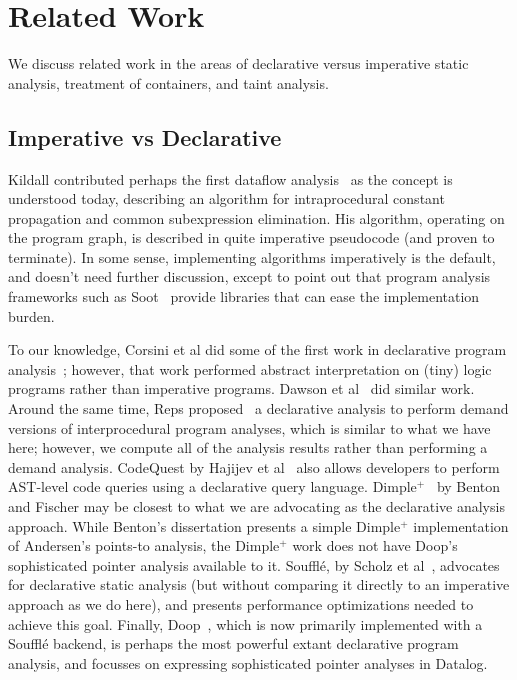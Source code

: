 \chapter{Related Work}
\label{chap:related}

We discuss related work in the areas of declarative versus imperative static analysis, treatment of containers, and taint analysis.

\section{Imperative vs Declarative}

Kildall contributed perhaps the first dataflow analysis~\cite{kildall73:_unified_approac_global_progr_optim} as the concept is understood today, describing an algorithm for intraprocedural constant propagation and common subexpression elimination. His algorithm, operating on the program graph, is described in quite imperative pseudocode (and proven to terminate). In some sense, implementing algorithms imperatively is the default, and doesn't need further discussion, except to point out that program analysis frameworks such as Soot~\cite{Vallee-Rai:1999:SJB:781995.782008} provide libraries that can ease the implementation burden.

To our knowledge, Corsini et al did some of the first work in declarative program analysis~\cite{corsini93:_effic}; however, that work performed abstract interpretation on (tiny) logic programs rather than imperative programs. Dawson et al~\cite{dawson96:_pract_progr_analy_using_gener} did similar work. Around the same time, Reps proposed~\cite{Reps1995} a declarative analysis to perform demand versions of interprocedural program analyses, which is similar to what we have here; however, we compute all of the analysis results rather than performing a demand analysis. CodeQuest by Hajijev et al~\cite{hajiyev06} also allows developers to perform AST-level code queries using a declarative query language. {\sc Dimple$^+$}~\cite{benton07:_inter_scalab_declar_progr_analy}\cite[Chapter 3]{benton08:_fast_effec_progr_analy_objec_level_paral} by Benton and Fischer may be closest to what we are advocating as the declarative analysis approach. While Benton's dissertation presents a simple {\sc Dimple$^+$} implementation of Andersen's points-to analysis, the {\sc Dimple$^+$} work does not have Doop's sophisticated pointer analysis available to it. Soufflé, by Scholz et al~\cite{scholz16:_fast_large_scale_progr_analy_datal}, advocates for declarative static analysis (but without comparing it directly to an imperative approach as we do here), and presents performance optimizations needed to achieve this goal.
Finally, Doop~\cite{bravenboer09:_stric_declar_specif_sophis_point_analy}, which is now primarily implemented with a Soufflé backend, is perhaps the most powerful extant declarative program analysis, and focusses on expressing sophisticated pointer analyses in Datalog. 



